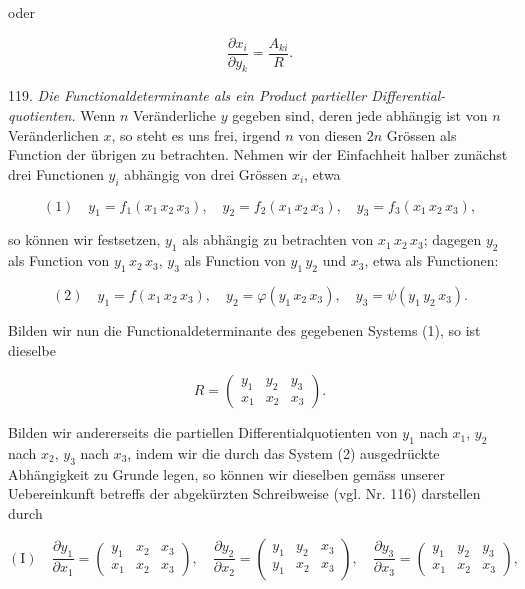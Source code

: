 oder

\[
\dfrac{\partial x_i}{\partial y_k} = \dfrac{A_{ki}}{R}.
\]

119. \textit{Die Functionaldeterminante als ein Product partieller Differential-
quotienten.} %
Wenn $n$ Veränderliche $y$ gegeben sind, deren jede abhängig
ist von $n$ Veränderlichen $x$, so steht es uns frei, irgend $n$ von diesen
$2n$ Grössen als Function der übrigen zu betrachten. Nehmen wir
der Einfachheit halber zunächst drei Functionen $y_i$ abhängig von drei
Grössen $x_i$, etwa

\[
(1) \quad y_1 = f_1(x_1\, x_2\, x_3), \quad y_2 = f_2(x_1\, x_2\, x_3), \quad y_3 = f_3(x_1\, x_2\, x_3),
\]

so können wir festsetzen, $y_1$ als abhängig zu betrachten von $x_1\, x_2\, x_3$;
dagegen $y_2$ als Function von $y_1\, x_2\, x_3$, $y_3$ als Function von $y_1\, y_2$ und $x_3$,
etwa als Functionen:

\[
(2) \quad y_1 = f(x_1\, x_2\, x_3), \quad y_2 = \varphi(y_1\, x_2\, x_3), \quad y_3 = \psi(y_1\, y_2\, x_3).
\]

Bilden wir nun die Functionaldeterminante des gegebenen Systems (1),
so ist dieselbe

\[
R = \begin{pmatrix} y_1 & y_2 & y_3 \\ x_1 & x_2 & x_3 \end{pmatrix}.
\]

Bilden wir andererseits die partiellen Differentialquotienten von $y_1$
nach $x_1$, $y_2$ nach $x_2$, $y_3$ nach $x_3$, indem wir die durch das System (2)
ausgedrückte Abhängigkeit zu Grunde legen, so können wir dieselben
gemäss unserer Uebereinkunft betreffs der abgekürzten Schreibweise
(vgl. Nr. 116) darstellen durch


\[
(\mathrm{I}) \quad \dfrac{\partial y_1}{\partial x_1} = \begin{pmatrix} y_1 & x_2 & x_3 \\ x_1 & x_2 & x_3 \end{pmatrix}, \quad
\dfrac{\partial y_2}{\partial x_2} = \begin{pmatrix} y_1 & y_2 & x_3 \\ y_1 & x_2 & x_3 \end{pmatrix}, \quad
\dfrac{\partial y_3}{\partial x_3} = \begin{pmatrix} y_1 & y_2 & y_3 \\ x_1 & x_2 & x_3 \end{pmatrix},
\]

